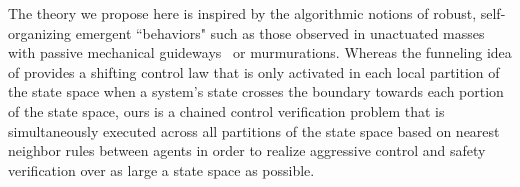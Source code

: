 The theory we propose here is inspired by the algorithmic notions of robust, self-organizing emergent ``behaviors" such as those observed in   unactuated masses with passive mechanical guideways~\cite{SeqCompKoditschek} or murmurations. Whereas the funneling idea of \cite{SeqCompKoditschek} provides a shifting control law that is only activated in each local partition of the state space when a system's state crosses the boundary towards each portion of the state space, ours is a chained control verification problem that is simultaneously executed across all partitions of the state space based on nearest neighbor rules between agents in order to realize aggressive control and safety verification over as large a state space as possible.

